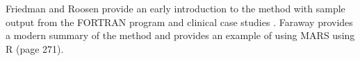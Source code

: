 Friedman and Roosen provide an early introduction to the method with sample output from the FORTRAN program and clinical case studies \cite{Friedman1995}.
Faraway provides a modern summary of the method and provides an example of using MARS using R \cite{Faraway2006} (page 271).


